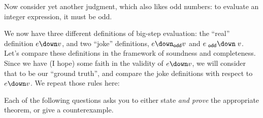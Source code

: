 Now consider yet another judgment, which also likes odd numbers:
to evaluate an integer expression, it must be odd.

\medskip
{}

We now have three different definitions of big-step evaluation: the ``real'' definition $e \down v$,
and two ``joke'' definitions, $e \downodd v$ and $e \odddown v$.
Let's compare these definitions in the framework of soundness and completeness.
Since we have (I hope) some faith in the validity of $e \down v$, we will consider that
to be our ``ground truth'', and compare the joke definitions with respect to $e \down v$.  We repeat those rules here:

\medskip
{}
\vspace*{-1.2ex}

Each of the following questions asks you to either state \emph{and prove} the appropriate theorem, or give a counterexample.


